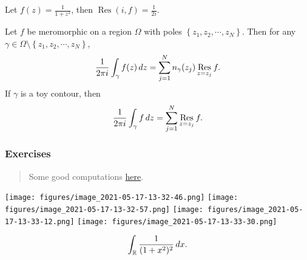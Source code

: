 \begin{example}

Let \(f(z) = \frac{1}{1+z^2}\), then
\(\mathop{\mathrm{Res}}(i, f) = \frac{1}{2i}\).

\end{example}

\begin{theorem}

Let \(f\) be meromorphic on a region \(\Omega\) with poles
\(\left\{{ { {z}_1, {z}_2, \cdots, {z}_{N}} }\right\}\). Then for any
\(\gamma \in \Omega\setminus\left\{{ { {z}_1, {z}_2, \cdots, {z}_{N}} }\right\}\),
\begin{align*}
{1 \over 2\pi i } \int_\gamma f(z) \,dz= \sum_{j=1}^N n_\gamma(z_j) \mathop{\mathrm{Res}}_{z=z_j} f
.\end{align*}
If \(\gamma\) is a toy contour, then\\
\begin{align*}
{1\over 2\pi i}\int_\gamma f\,dz= \sum_{j=1}^N \mathop{\mathrm{Res}}_{z=z_j}f
.\end{align*}

\end{theorem}

\hypertarget{exercises-2}{%
\subsubsection{Exercises}\label{exercises-2}}

\begin{quote}
Some good computations
\href{https://math.mit.edu/~jorloff/18.04/notes/topic9.pdf}{here}.
\end{quote}

\texttt{[image: figures/image\_2021-05-17-13-32-46.png]}
\texttt{[image: figures/image\_2021-05-17-13-32-57.png]}
\texttt{[image: figures/image\_2021-05-17-13-33-12.png]}
\texttt{[image: figures/image\_2021-05-17-13-33-30.png]}

\begin{exercise}[?]

\begin{align*}
\int_{\mathbb{R}}{1 \over (1+x^2)^2} \,dx
.\end{align*}

\end{exercise}

